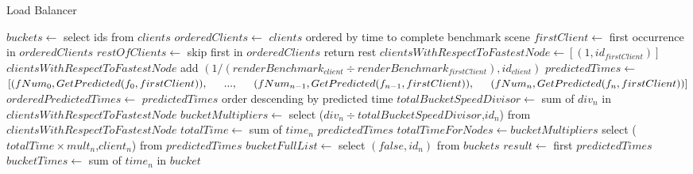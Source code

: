 ﻿\documentclass[a4paper]{article}
\begin{document}
    \setcounter{algorithm}{1}
    \begin{algorithm}
        \caption{Load Balancer}\label{alg:cap}
        \begin{algorithmic}[1]
            \State $buckets \gets$ select ids from $clients$
            \State $orderedClients \gets$ $clients$ ordered by time to complete benchmark scene
            \State $firstClient \gets$ first occurrence in $orderedClients$
            \State $restOfClients \gets$ skip first in $orderedClients$ return rest
            \State $clientsWithRespectToFastestNode \gets [(1,id_{firstClient})]$
            \State
                \State $clientsWithRespectToFastestNode $ add $(1/(renderBenchmark_{client} \div renderBenchmark_{firstClient}),id_{client})$
            \EndFor
            \State $predictedTimes \gets$ \newline \indent $[(fNum_0, GetPredicted(f_0,firstClient)), \newline \indent ..., \newline \indent (fNum_{n-1}, GetPredicted(f_{n-1},firstClient)), \newline \indent (fNum_{n}, GetPredicted(f_{n},firstClient))]$
            \State $orderedPredictedTimes \gets$ $predictedTimes$ order descending by predicted time
            \State $totalBucketSpeedDivisor \gets$ sum of $div_n$ in $clientsWithRespectToFastestNode$
            \State $bucketMultipliers \gets$ select ($div_n \div totalBucketSpeedDivisor$,$id_n$) from $clientsWithRespectToFastestNode$
            \State $totalTime \gets$ sum of $time_n$ $predictedTimes$
            \State $totalTimeForNodes \gets bucketMultipliers$ select ($totalTime \times mult_n$,$client_n$) from $predictedTimes$
            \State $bucketFullList \gets$ select $(false,id_n)$ from $buckets$
            \State
                \State $result \gets$ first $predictedTimes$
                    \State $bucketTimes \gets$ sum of $time_n$ in $bucket$

\end{algorithmic}
\end{algorithm}
\end{document}
